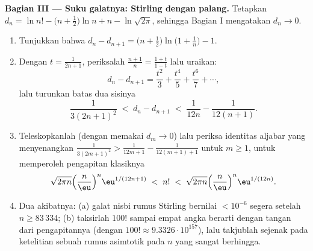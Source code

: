 \begin{problem}
\medskip
\noindent\textbf{Bagian III --- Suku galatnya: Stirling dengan
palang.} Tetapkan $d_n = \ln n! - \bigl(n + \tfrac12\bigr)\ln n + n -
\ln\sqrt{2\pi}$, sehingga Bagian I mengatakan $d_n \to 0$.
\begin{enumerate}[resume]
  \item Tunjukkan bahwa $d_n - d_{n+1} = \bigl(n +
        \tfrac12\bigr)\ln\bigl(1 + \tfrac1n\bigr) - 1$.
  \item Dengan $t = \frac1{2n+1}$, periksalah $\frac{n+1}n =
        \frac{1+t}{1-t}$ lalu uraikan:
        \[
        d_n - d_{n+1} = \frac{t^2}3 + \frac{t^4}5 +
        \frac{t^6}7 + \cdots,
        \]
        lalu turunkan batas dua sisinya
        \[
        \frac1{3(2n+1)^2} \;<\; d_n - d_{n+1} \;<\;
        \frac1{12n} - \frac1{12(n+1)} .
        \]
  \item Teleskopkanlah (dengan memakai $d_m \to 0$) lalu periksa identitas
        aljabar yang menyenangkan $\frac1{3(2m+1)^2} >
        \frac1{12m+1} - \frac1{12(m+1)+1}$ untuk $m \geq 1$, untuk
        memperoleh pengapitan klasiknya
        \[
        \sqrt{2\pi n}\Bigl(\frac n\eu\Bigr)^n
        \eu^{1/(12n+1)} \;<\; n! \;<\;
        \sqrt{2\pi n}\Bigl(\frac n\eu\Bigr)^n\eu^{1/(12n)} .
        \]
  \item Dua akibatnya: (a) galat nisbi rumus Stirling
        bernilai $< 10^{-6}$ segera setelah $n \geq 83\,334$;
        (b) taksirlah $100!$ sampai empat angka berarti dengan tangan
        dari pengapitannya (dengan $100! \approx 9.3326\cdot
        10^{157}$), lalu takjublah sejenak pada ketelitian sebuah
        rumus asimtotik pada $n$ yang sangat berhingga.
\end{enumerate}


\end{problem}
